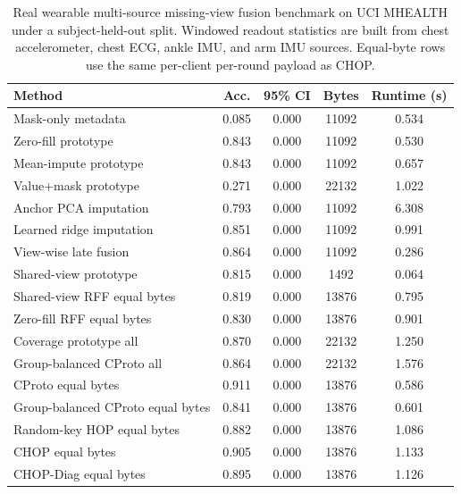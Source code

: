 \begin{table}[t]
\centering
\caption{Real wearable multi-source missing-view fusion benchmark on UCI MHEALTH under a subject-held-out split. Windowed readout statistics are built from chest accelerometer, chest ECG, ankle IMU, and arm IMU sources. Equal-byte rows use the same per-client per-round payload as CHOP.}
\label{tab:if-mhealth-fusion}
\scriptsize
\setlength{\tabcolsep}{3pt}
\renewcommand{\arraystretch}{0.94}
\begin{tabular}{lcccc}
\toprule
Method & Acc. & 95\% CI & Bytes & Runtime (s) \\
\midrule
Mask-only metadata & 0.085 & 0.000 & 11092 & 0.534 \\
Zero-fill prototype & 0.843 & 0.000 & 11092 & 0.530 \\
Mean-impute prototype & 0.843 & 0.000 & 11092 & 0.657 \\
Value+mask prototype & 0.271 & 0.000 & 22132 & 1.022 \\
Anchor PCA imputation & 0.793 & 0.000 & 11092 & 6.308 \\
Learned ridge imputation & 0.851 & 0.000 & 11092 & 0.991 \\
View-wise late fusion & 0.864 & 0.000 & 11092 & 0.286 \\
Shared-view prototype & 0.815 & 0.000 & 1492 & 0.064 \\
Shared-view RFF equal bytes & 0.819 & 0.000 & 13876 & 0.795 \\
Zero-fill RFF equal bytes & 0.830 & 0.000 & 13876 & 0.901 \\
Coverage prototype all & 0.870 & 0.000 & 22132 & 1.250 \\
Group-balanced CProto all & 0.864 & 0.000 & 22132 & 1.576 \\
CProto equal bytes & 0.911 & 0.000 & 13876 & 0.586 \\
Group-balanced CProto equal bytes & 0.841 & 0.000 & 13876 & 0.601 \\
Random-key HOP equal bytes & 0.882 & 0.000 & 13876 & 1.086 \\
CHOP equal bytes & 0.905 & 0.000 & 13876 & 1.133 \\
CHOP-Diag equal bytes & 0.895 & 0.000 & 13876 & 1.126 \\
\bottomrule
\end{tabular}
\end{table}
